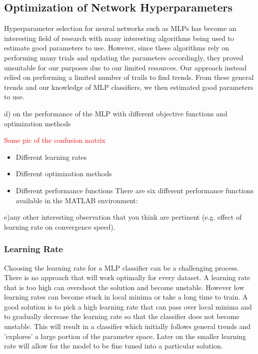 \FloatBarrier
\subsection{Optimization of Network Hyperparameters}\label{subsec:optNet}
Hyperparameter selection for neural networks such as MLPs has become an interesting field of research with many interesting algorithms being used to estimate good parameters to use\cite{bergstra2011algorithms}. However, since these algorithms rely on performing many trials and updating the parameters accordingly, they proved unsuitable for our purposes due to our limited resources. Our approach instead relied on performing a limited number of trails to find trends. From these general trends and our knowledge of MLP classifiers, we then estimated good parameters to use.


d) on the performance of the MLP with different objective functions and optimization methods

\textcolor{red}{Some pic of the confusion matrix}

\begin{itemize}
   	\item Different learning rates

   	\item Different optimization methods

   	\item Different performance functions
   	There are six different performance functions available in the MATLAB environment:


\end{itemize}
e)any other interesting observation that you think are pertinent (e.g. effect of learning rate on convergence speed).

\subsubsection{Learning Rate}

Choosing the learning rate for a MLP classifier can be a challenging process. There is no approach that will work optimally for every dataset. A learning rate that is too high can overshoot the solution and become unstable. However low learning rates can become stuck in local minima or take a long time to train. A good solution is to pick a high learning rate that can pass over local minima and  to gradually decrease the learning rate so that the classifier does not become unstable. This will result in a classifier which initially follows general trends and 'explores' a large portion of the parameter space. Later on the smaller learning rate will allow for the model to be fine tuned into a particular solution.


